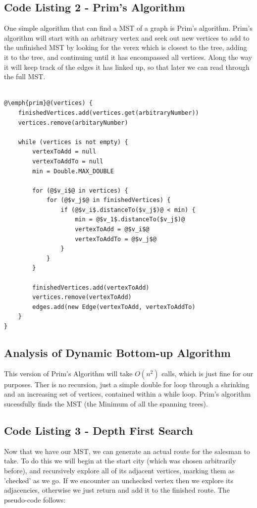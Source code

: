 \documentclass[paper=a4, fontsize=11pt]{scrartcl} %
\numberwithin{equation}{section} %
\numberwithin{figure}{section} %
\numberwithin{table}{section} %
\begin{document}

\subsection{Code Listing 2 - Prim's Algorithm}
One simple algorithm that can find a MST of a graph is Prim's algorithm. Prim's algorithm will start with an arbitrary vertex and seek out new vertices to add to the unfinished MST by looking for the verex which is closest to the tree, adding it to the tree, and continuing until it has encompassed all vertices. Along the way it will keep track of the edges it has linked up, so that later we can read through the full MST. 
\begin{lstlisting}

@\emph{prim}@(vertices) {
	finishedVertices.add(vertices.get(arbitraryNumber))
	vertices.remove(arbitaryNumber)
	
	while (vertices is not empty) {
		vertexToAdd = null
		vertexToAddTo = null
		min = Double.MAX_DOUBLE
				
		for (@$v_i$@ in vertices) {
			for (@$v_j$@ in finishedVertices) {
				if (@$v_i$.distanceTo($v_j$)@ < min) {
					min = @$v_1$.distanceTo($v_j$)@
  					vertexToAdd = @$v_i$@
  					vertexToAddTo = @$v_j$@
				}
			}
		}
		
		finishedVertices.add(vertexToAdd)
		vertices.remove(vertexToAdd)
		edges.add(new Edge(vertexToAdd, vertexToAddTo)
	}
}
\end{lstlisting}

\subsection{Analysis of Dynamic Bottom-up Algorithm}

This version of Prim's Algorithm will take $O(n^2)$ calls, which is just fine for our purposes. Ther is no recursion, just a simple double for loop through a shrinking and an increasing set of vertices, contained within a while loop. Prim's algorithm sucessfully finds the MST (the Minimum of all the spanning trees).

\subsection{Code Listing 3 - Depth First Search}

Now that we have our MST, we can generate an actual route for the salesman to take. To do this we will begin at the start city (which was chosen arbitrarily before), and recursively explore all of its adjacent vertices, marking them as 'checked' as we go. If we encounter an unchecked vertex then we explore its adjacencies, otherwise we just return and add it to the finished route. The pseudo-code follows:
 
\end{document}
